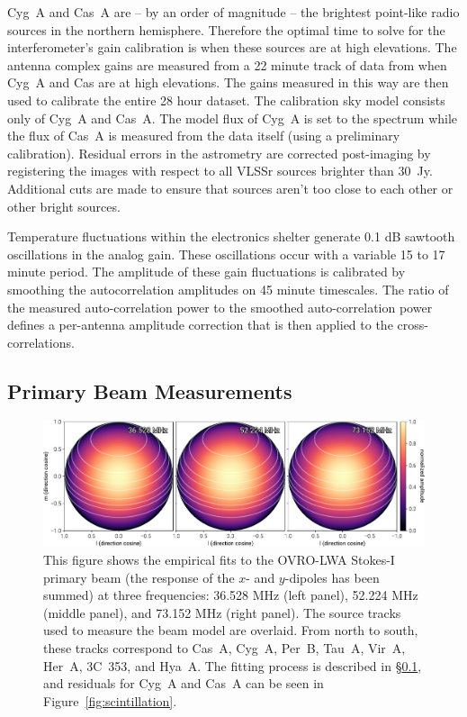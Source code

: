 \documentclass[twocolumn]{aastex61}
\begin{document}
Cyg~A and Cas~A are -- by an order of magnitude -- the brightest point-like radio sources in the
northern hemisphere. Therefore the optimal time to solve for the interferometer's gain calibration
is when these sources are at high elevations.  The antenna complex gains are measured from a 22
minute track of data from when Cyg~A and Cas are at high elevations. The gains measured in this way
are then used to calibrate the entire 28 hour dataset. The calibration sky model consists only of
Cyg~A and Cas~A. The model flux of Cyg~A is set to the \citet{1977A&A....61...99B} spectrum while
the flux of Cas~A is measured from the data itself (using a preliminary calibration).  Residual
errors in the astrometry are corrected post-imaging by registering the images with respect to all
VLSSr \citep{2014MNRAS.440..327L} sources brighter than 30~Jy. Additional cuts are made to ensure
that sources aren't too close to each other or other bright sources.

Temperature fluctuations within the electronics shelter generate 0.1 dB sawtooth oscillations in the
analog gain. These oscillations occur with a variable 15 to 17 minute period. The amplitude of these
gain fluctuations is calibrated by smoothing the autocorrelation amplitudes on 45 minute timescales.
The ratio of the measured auto-correlation power to the smoothed auto-correlation power defines a
per-antenna amplitude correction that is then applied to the cross-correlations.

\subsection{Primary Beam Measurements}\label{sec:beam}

\begin{figure}[t]
    \includegraphics[width=\textwidth]{figures/beam/beam}
    \caption{
        This figure shows the empirical fits to the OVRO-LWA Stokes-I primary beam (the response of
        the $x$- and $y$-dipoles has been summed) at three frequencies: 36.528 MHz (left panel),
        52.224 MHz (middle panel), and 73.152 MHz (right panel). The source tracks used to measure
        the beam model are overlaid. From north to south, these tracks correspond to Cas~A, Cyg~A,
        Per~B, Tau~A, Vir~A, Her~A, 3C~353, and Hya~A.  The fitting process is described in
        \S\ref{sec:beam}, and residuals for Cyg~A and Cas~A can be seen in
        Figure~\ref{fig:scintillation}.
    }
    \label{fig:beam}
\end{figure}
\end{document}
